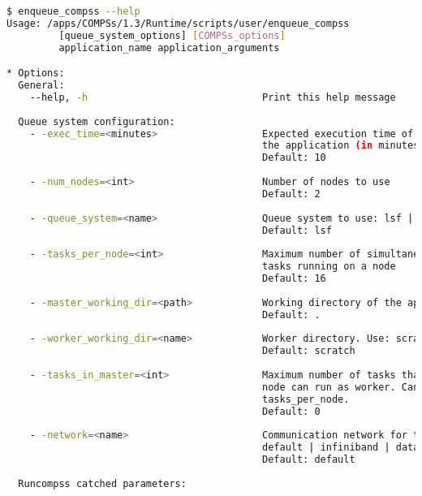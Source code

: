 \begin{lstlisting}[language=bash]
$ enqueue_compss --help
Usage: /apps/COMPSs/1.3/Runtime/scripts/user/enqueue_compss 
         [queue_system_options] [COMPSs_options] 
         application_name application_arguments

* Options:
  General:
    --help, -h                              Print this help message
  
  Queue system configuration:
    - -exec_time=<minutes>                  Expected execution time of 
                                            the application (in minutes)
                                            Default: 10
                                            
    - -num_nodes=<int>                      Number of nodes to use
                                            Default: 2
                                            
    - -queue_system=<name>                  Queue system to use: lsf | pbs | slurm
                                            Default: lsf
                                            
    - -tasks_per_node=<int>                 Maximum number of simultaneous
                                            tasks running on a node
                                            Default: 16
                                            
    - -master_working_dir=<path>            Working directory of the application
                                            Default: .
                                            
    - -worker_working_dir=<name>            Worker directory. Use: scratch | gpfs
                                            Default: scratch
                                            
    - -tasks_in_master=<int>                Maximum number of tasks that the master
                                            node can run as worker. Cannot exceed 
                                            tasks_per_node.
                                            Default: 0
                                            
    - -network=<name>                       Communication network for transfers:
                                            default | infiniband | data.
                                            Default: default
                                            
  Runcompss catched parameters:


\end{lstlisting}
